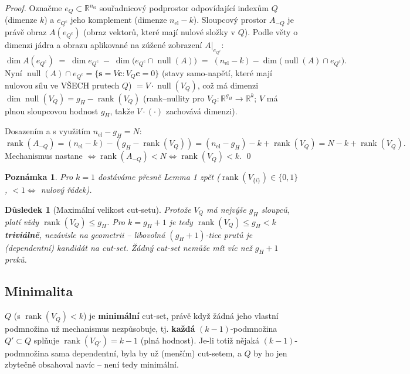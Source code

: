 \documentclass[11pt,a4paper]{article}
\newtheorem{corollary}{Důsledek}
\newtheorem{remark}{Poznámka}
\newcommand{\R}{\mathbb{R}}
\newcommand{\rank}{\operatorname{rank}}
\begin{document}
\begin{proof}
Označme $e_{Q}\subset\R^{n_{\mathrm{el}}}$ souřadnicový podprostor odpovídající indexům $Q$ (dimenze
$k$) a $e_{Q^c}$ jeho komplement (dimenze $n_{\mathrm{el}}-k$). Sloupcový prostor $A_{-Q}$ je právě
obraz $A(e_{Q^c})$ (obraz vektorů, které mají nulové složky v $Q$). Podle věty o dimenzi jádra a obrazu
aplikované na zúžené zobrazení $A|_{e_{Q^c}}$:
\[
  \dim A(e_{Q^c}) \;=\; \dim e_{Q^c} \;-\; \dim\big(e_{Q^c}\cap \operatorname{null}(A)\big)
  \;=\; (n_{\mathrm{el}}-k) - \dim\big(\operatorname{null}(A)\cap e_{Q^c}\big).
\]
Nyní $\operatorname{null}(A)\cap e_{Q^c} = \{\mathbf s = V\mathbf c : V_Q\mathbf c = 0\}$ (stavy
samo-napětí, které mají nulovou sílu ve VŠECH prutech $Q$) $=V\cdot\operatorname{null}(V_Q)$, což má
dimenzi $\dim\operatorname{null}(V_Q) = g_H - \rank(V_Q)$ (rank--nullity pro $V_Q:\R^{g_H}\to\R^k$;
$V$ má plnou sloupcovou hodnost $g_H$, takže $V\cdot(\cdot)$ zachovává dimenzi).

Dosazením a s využitím $n_{\mathrm{el}} - g_H = N$:
\[
  \rank(A_{-Q}) = (n_{\mathrm{el}}-k) - (g_H-\rank(V_Q)) = (n_{\mathrm{el}}-g_H) - k + \rank(V_Q)
  = N - k + \rank(V_Q).
\]
Mechanismus nastane $\iff \rank(A_{-Q}) < N \iff \rank(V_Q) < k$. \qed
\end{proof}

\begin{remark}
Pro $k=1$ dostáváme přesně Lemma 1 zpět ($\rank(V_{\{i\}})\in\{0,1\}$, $<1 \iff$ nulový řádek).
\end{remark}

\begin{corollary}[Maximální velikost cut-setu]
Protože $V_Q$ má nejvýše $g_H$ sloupců, platí vždy $\rank(V_Q)\le g_H$. Pro $k=g_H+1$ je tedy
$\rank(V_Q)\le g_H < k$ \textbf{triviálně}, nezávisle na geometrii -- libovolná $(g_H{+}1)$-tice prutů
je (dependentní) kandidát na cut-set. Žádný cut-set nemůže mít víc než $g_H+1$ prvků.
\end{corollary}

\subsection{Minimalita}

$Q$ (s $\rank(V_Q)<k$) je \textbf{minimální} cut-set, právě když žádná jeho vlastní podmnožina už
mechanismus nezpůsobuje, tj. \textbf{každá} $(k{-}1)$-podmnožina $Q'\subset Q$ splňuje
$\rank(V_{Q'}) = k-1$ (plná hodnost). Je-li totiž nějaká $(k{-}1)$-podmnožina sama dependentní, byla by
už (menším) cut-setem, a $Q$ by ho jen zbytečně obsahoval navíc -- není tedy minimální.
\end{document}
